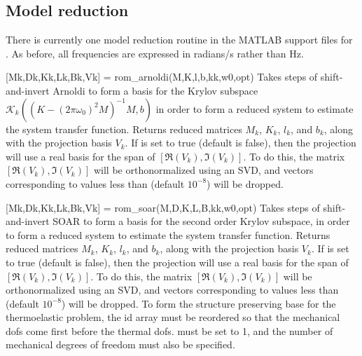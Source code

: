 \subsection{Model reduction}
There is currently one model reduction routine in the MATLAB support
files for \hiq.  As before, all frequencies are expressed in radians/s
rather than Hz.
\begin{codelist}

  \item[{[Mk,Dk,Kk,Lk,Bk,Vk]} = rom\_arnoldi(M,K,l,b,kk,w0,opt)] 
    Takes  steps of
    shift-and-invert Arnoldi to form a basis for the Krylov subspace
    $\mathcal{K}_k\left( (K-(2 \pi \omega_0)^2 M)^{-1} M, b \right)$
    in order to form a reduced system to estimate the system transfer
    function.  Returns reduced matrices $M_k$, $K_k$, $l_k$, and
    $b_k$, along with the projection basis $V_k$.  If
     is set to true (default is false), then the
    projection will use a real basis for the span of $[\Re(V_k),
    \Im(V_k)]$.  To do this, the matrix $[\Re(V_k), \Im(V_k)]$ will be
    orthonormalized using an SVD, and vectors corresponding to values
    less than  (default $10^{-8}$) will be dropped.

   \item[{[Mk,Dk,Kk,Lk,Bk,Vk]} = rom\_soar(M,D,K,L,B,kk,w0,opt)]
    Takes  steps of 
    shift-and-invert SOAR to form a basis for the second order 
    Krylov subspace,
    in order to form a reduced system to estimate the system transfer
    function.  Returns reduced matrices $M_k$, $K_k$, $l_k$, and
    $b_k$, along with the projection basis $V_k$.  If
     is set to true (default is false), then the
    projection will use a real basis for the span of $[\Re(V_k),
    \Im(V_k)]$.  To do this, the matrix $[\Re(V_k), \Im(V_k)]$ will be
    orthonormalized using an SVD, and vectors corresponding to values
    less than  (default $10^{-8}$) will be dropped.
    To form the structure preserving base for the thermoelastic problem,
    the id array must be reordered so that the mechanical dofs come first
    before the thermal dofs.  must be set to 1, and 
    the number of mechanical degrees of freedom must also be specified.

\end{codelist}
